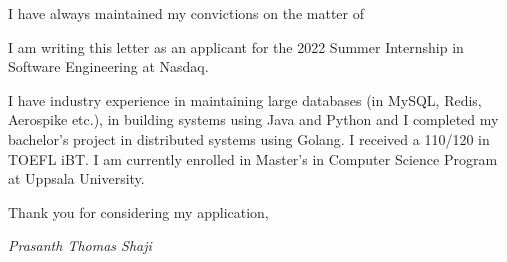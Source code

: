 \documentclass{article}
\begin{document}
{\large I have always maintained my convictions on the matter of }

{\large I am writing this letter as an applicant for the 2022 Summer Internship in Software Engineering at Nasdaq.}

{\large I have industry experience in maintaining large databases (in MySQL, Redis, Aerospike etc.), in building systems using Java and Python and I completed my bachelor’s project in distributed systems using Golang. I received a 110/120 in TOEFL iBT. I am currently enrolled in Master's in Computer Science Program at Uppsala University.}

{\large Thank you for considering my application,}

{\large \textit{Prasanth Thomas Shaji}}
\end{document}
